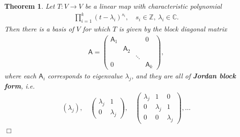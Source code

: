 \documentclass[letter-paper]{tufte-book}
\newtheorem{theorem}{\color{pastel-blue}Theorem}[section]
\newcommand{\As}{{\mathsf{A}}}
\newcommand{\qedwhite}{\hfill \ensuremath{\Box}}
\begin{document}
\begin{theorem}
  Let $T: V \to V$ be a linear map with characteristic polynomial
  \begin{align*}
    \prod_{i=1}^k (t - \lambda_i)^{s_i}, \quad s_i \in \mathbb{Z},\ \lambda_i \in \mathbb{C}.
  \end{align*}
  Then there is a basis of $V$ for which $T$ is given by the block diagonal matrix
  \begin{align*}
    \As = \begin{pmatrix}\As_1 &  &  & 0 \\  & \As_2 & & \\ & & \ddots & \\ 0 & & & \As_k \end{pmatrix},
  \end{align*}
  where each $\As_i$ corresponds to eigenvalue $\lambda_j$, and they are all of \textbf{Jordan block form}, i.e.
  \begin{align*}
    (\lambda_j), \quad \begin{pmatrix} \lambda_j & 1 \\ 0 & \lambda_j \end{pmatrix}, \quad \begin{pmatrix} \lambda_j & 1 & 0 \\ 0 & \lambda_j & 1 \\ 0 & 0 & \lambda_j \end{pmatrix}, \ldots
  \end{align*}
  \qedwhite
\end{theorem}
\end{document}
